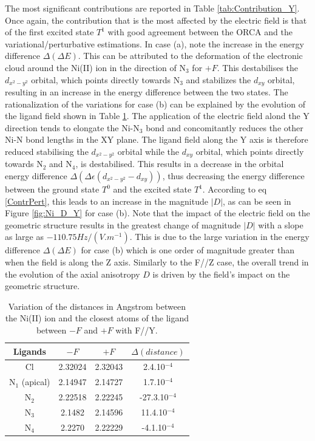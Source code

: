 \documentclass[10pt]{report}
\numberwithin{equation}{section}
\begin{document}
The most significant contributions are reported in Table \ref{tab:Contribution_Y}. 
Once again, the contribution that is the most affected by the electric field is that of the first excited state $T^1$ with good agreement between the ORCA and the variational/perturbative estimations.
In case (a), note the increase in the energy difference $\Delta (\Delta E)$.
This can be attributed to the deformation of the electronic cloud around the Ni(II) ion in the direction of N$_3$ for $+F$. 
This destabilises the $d_{x^2-y^2}$ orbital, which points directly towards N$_3$ and stabilizes the $d_{xy}$ orbital, resulting in an increase in the energy difference between the two states.
The rationalization of the variations for case (b) can be explained by the evolution of the ligand field shown in Table \ref{tab:DistanceY}.
The application of the electric field alond the Y direction tends to elongate the Ni-N$_3$ bond and concomitantly reduces the other Ni-N bond lengths in the XY plane.
The ligand field along the Y axis is therefore reduced stabilising the $d_{x^2-y^2}$ orbital while the $d_{xy}$ orbital, which points directly towards N$_2$ and N$_4$, is destabilised. 
This results in a decrease in the orbital energy difference $\Delta (\Delta \epsilon (d_{x^2-y^2}-d_{xy}))$, thus decreasing the energy difference between the ground state $T^0$ and the excited state $T^1$.
According to eq \ref{ContrPert}, this leads to an increase in the magnitude $|D|$, as can be seen in Figure \ref{fig:Ni_D_Y} for case (b).
Note that the impact of the electric field on the geometric structure results in the greatest change of magnitude $|D|$ with a slope as large as $-110.75 Hz/(V.m^{-1})$.
This is due to the large variation in the energy difference $\Delta (\Delta E)$ for case (b) which is one order of magnitude greater than when the field is along the Z axis.
Similarly to the F//Z case, the overall trend in the evolution of the axial anisotropy $D$ is driven by the field's impact on the geometric structure.


\begin{table}[!ht]
    \centering
    \begin{tabular}{| c | c| c | c |}
        \hline
        Ligands & $-F$ & $+F$ &$\Delta(distance)$\\
        \hline
        Cl & 2.32024& 2.32043&  2.4.10$^{-4}$\\
        N$_1$ (apical) & 2.14947  & 2.14727 &1.7.10$^{-4}$\\
        N$_2$ & 2.22518& 2.22245&-27.3.10$^{-4}$ \\
        N$_3$ & 2.1482& 2.14596&11.4.10$^{-4}$ \\
        N$_4$ & 2.2270& 2.22229 &-4.1.10$^{-4}$\\
        \hline
    \end{tabular}
    \caption{Variation of the distances in Angstrom between the Ni(II) ion and the closest atoms of the ligand between $-F$ and $+F$ with F//Y.}
    \label{tab:DistanceY}
\end{table}
\end{document}
